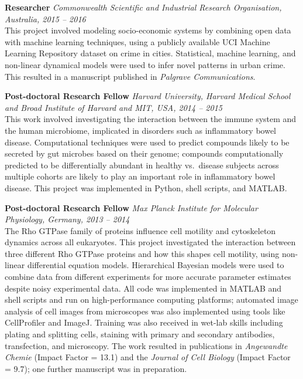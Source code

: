 \documentclass[11pt,a4paper]{article}
\newcommand{\entry}[3]{%
  \noindent\textbf{#1} \hfill \textit{#2}\\
  #3\par\smallskip
}
\begin{document}
\entry{Researcher}{Commonwealth Scientific and Industrial Research Organisation, Australia, 2015 -- 2016}{
This project involved modeling socio-economic systems by combining open data with machine learning techniques, using a publicly available UCI Machine Learning Repository dataset on crime in cities. Statistical, machine learning, and non-linear dynamical models were used to infer novel patterns in urban crime. This resulted in a manuscript published in \textit{Palgrave Communications}.}

\entry{Post-doctoral Research Fellow}{Harvard University, Harvard Medical School and Broad Institute of Harvard and MIT, USA, 2014 -- 2015}{
This work involved investigating the interaction between the immune system and the human microbiome, implicated in disorders such as inflammatory bowel disease. Computational techniques were used to predict compounds likely to be secreted by gut microbes based on their genome; compounds computationally predicted to be differentially abundant in healthy vs.\ disease subjects across multiple cohorts are likely to play an important role in inflammatory bowel disease. This project was implemented in Python, shell scripts, and MATLAB.}

\entry{Post-doctoral Research Fellow}{Max Planck Institute for Molecular Physiology, Germany, 2013 -- 2014}{
The Rho GTPase family of proteins influence cell motility and cytoskeleton dynamics across all eukaryotes. This project investigated the interaction between three different Rho GTPase proteins and how this shapes cell motility, using non-linear differential equation models. Hierarchical Bayesian models were used to combine data from different experiments for more accurate parameter estimates despite noisy experimental data. All code was implemented in MATLAB and shell scripts and run on high-performance computing platforms; automated image analysis of cell images from microscopes was also implemented using tools like CellProfiler and ImageJ. Training was also received in wet-lab skills including plating and splitting cells, staining with primary and secondary antibodies, transfection, and microscopy. The work resulted in publications in \textit{Angewandte Chemie} (Impact Factor = 13.1) and the \textit{Journal of Cell Biology} (Impact Factor = 9.7); one further manuscript was in preparation.}
\end{document}
